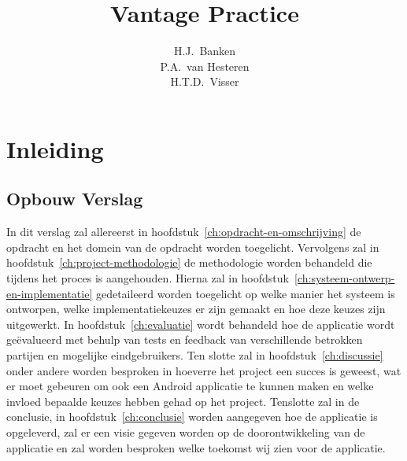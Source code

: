 \documentclass[dutch]{style/tudelft-report}
\begin{document}
\def \mylaps {MyLaps\xspace}

\frontmatter

\title[Bachelorproject]{Vantage Practice}
\author{H.J.\ Banken \\ P.A.\ van Hesteren \\ H.T.D.\ Visser}
\makecover





\tableofcontents



\mainmatter

\chapter{Inleiding} \label{ch:inleiding} 

\section*{Opbouw Verslag}

In dit verslag zal allereerst in hoofdstuk~\ref{ch:opdracht-en-omschrijving} de opdracht en het domein van de opdracht worden toegelicht. Vervolgens zal in hoofdstuk~\ref{ch:project-methodologie} de methodologie worden behandeld die tijdens het proces is aangehouden. Hierna zal in hoofdstuk~\ref{ch:systeem-ontwerp-en-implementatie} gedetaileerd worden toegelicht op welke manier het systeem is ontworpen, welke implementatiekeuzes er zijn gemaakt en hoe deze keuzes zijn uitgewerkt. In hoofdstuk~\ref{ch:evaluatie} wordt behandeld hoe de applicatie wordt geëvalueerd met behulp van tests en feedback van verschillende betrokken partijen en mogelijke eindgebruikers. Ten slotte zal in hoofdstuk~\ref{ch:discussie} onder andere worden besproken in hoeverre het project een succes is geweest, wat er moet gebeuren om ook een Android applicatie te kunnen maken en welke invloed bepaalde keuzes hebben gehad op het project. Tenslotte zal in de conclusie, in hoofdstuk~\ref{ch:conclusie} worden aangegeven hoe de applicatie is opgeleverd, zal er een visie gegeven worden op de doorontwikkeling van de applicatie en zal worden besproken welke toekomst wij zien voor de applicatie.
\end{document}
